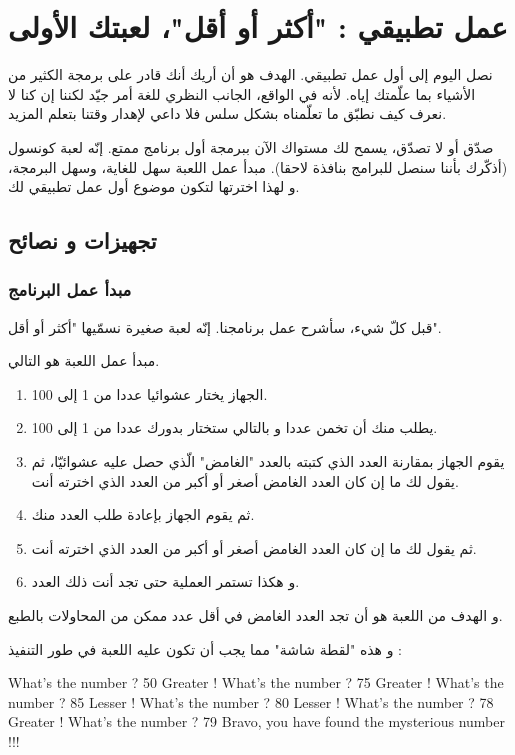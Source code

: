 \chapter{عمل تطبيقي : "أكثر أو أقل"، لعبتك الأولى}

نصل اليوم إلى أول عمل تطبيقي. الهدف هو أن أريك أنك قادر على برمجة الكثير من الأشياء بما علّمتك إياه. لأنه في الواقع، الجانب النظري للغة أمر جيّد لكننا إن كنا لا نعرف كيف نطبّق ما تعلّمناه بشكل سلس فلا داعي لإهدار وقتنا بتعلم المزيد.

صدّق أو لا تصدّق، يسمح لك مستواك الآن ببرمجة أول برنامج ممتع. إنّه لعبة كونسول (أذكّرك بأننا سنصل للبرامج بنافذة لاحقا). مبدأ عمل اللعبة سهل للغاية، وسهل البرمجة، و لهذا اخترتها لتكون موضوع أول عمل تطبيقي لك.

\section{تجهيزات و نصائح}

\subsection{مبدأ عمل البرنامج}

قبل كلّ شيء، سأشرح عمل برنامجنا. إنّه لعبة صغيرة نسمّيها "أكثر أو أقل".

مبدأ عمل اللعبة  هو التالي.

\begin{enumerate}
	\item الجهاز يختار عشوائيا عددا من 1 إلى 100.
	\item يطلب منك أن تخمن عددا و بالتالي ستختار بدورك عددا من 1 إلى 100.
	\item يقوم الجهاز بمقارنة العدد الذي كتبته بالعدد "الغامض" الّذي حصل عليه عشوائيّا، ثم يقول لك ما إن كان العدد الغامض أصغر أو أكبر من العدد الذي اخترته أنت.
	\item ثم يقوم الجهاز بإعادة طلب العدد منك.
	\item ثم يقول لك ما إن كان العدد الغامض أصغر أو أكبر من العدد الذي اخترته أنت.
	\item و هكذا تستمر العملية حتى تجد أنت ذلك العدد.
\end{enumerate}
و الهدف من اللعبة هو أن تجد العدد الغامض في أقل عدد ممكن من المحاولات بالطبع.

و هذه "لقطة شاشة" مما يجب أن تكون عليه اللعبة في طور التنفيذ :

\begin{Console}
What's the number ? 50
Greater !
What's the number ? 75
Greater  !
What's the number ? 85
Lesser !
What's the number ? 80
Lesser !
What's the number ? 78
Greater !
What's the number ? 79
Bravo, you have found the mysterious number !!!
\end{Console}

